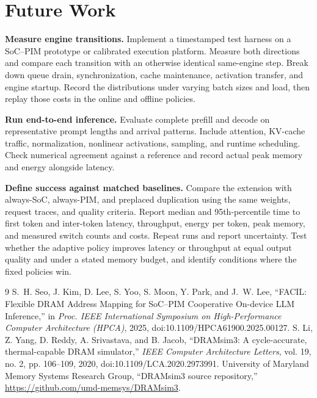 \documentclass[conference,10pt]{IEEEtran}
\begin{document}
\section{Future Work}
\textbf{Measure engine transitions.} Implement a timestamped
test harness on a SoC--PIM prototype or calibrated execution
platform. Measure both directions and compare each transition
with an otherwise identical same-engine step. Break down queue
drain, synchronization, cache maintenance, activation transfer,
and engine startup. Record the distributions under varying
batch sizes and load, then replay those costs in the online
and offline policies.

\textbf{Run end-to-end inference.} Evaluate complete prefill and
decode on representative prompt lengths and arrival patterns.
Include attention, KV-cache traffic, normalization, nonlinear
activations, sampling, and runtime scheduling. Check numerical
agreement against a reference and record actual peak memory
and energy alongside latency.

\textbf{Define success against matched baselines.} Compare the
extension with always-SoC, always-PIM, and preplaced duplication
using the same weights, request traces, and quality criteria.
Report median and 95th-percentile time to first token and
inter-token latency, throughput, energy per token, peak memory,
and measured switch counts and costs. Repeat runs and report
uncertainty. Test whether the adaptive policy improves latency
or throughput at equal output quality and under a stated memory
budget, and identify conditions where the fixed policies win.

\balance
\begin{thebibliography}{9}
 S.~H. Seo, J. Kim, D. Lee, S. Yoo, S. Moon,
Y. Park, and J.~W. Lee, ``FACIL: Flexible DRAM Address Mapping for
SoC--PIM Cooperative On-device LLM Inference,'' in \emph{Proc.
IEEE International Symposium on High-Performance Computer
Architecture (HPCA)}, 2025, doi:10.1109/HPCA61900.2025.00127.
 S. Li, Z. Yang, D. Reddy, A. Srivastava,
and B. Jacob, ``DRAMsim3: A cycle-accurate, thermal-capable DRAM
simulator,'' \emph{IEEE Computer Architecture Letters}, vol. 19,
no. 2, pp. 106--109, 2020, doi:10.1109/LCA.2020.2973991.
 University of Maryland Memory Systems
Research Group, ``DRAMsim3 source repository,''
\url{https://github.com/umd-memsys/DRAMsim3}.
\end{thebibliography}
\end{document}
